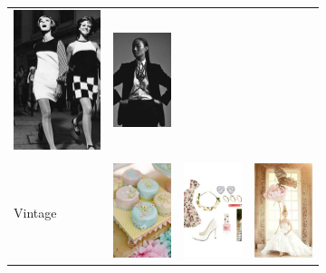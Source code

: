\begin{figure}
\begin{subfigure}[t]{0.48\linewidth}
\begin{tabular}{m{.05in}|m{\dgap} m{\dgap} m{\dgap}}
    \includegraphics[width=.8in]{../style/figures/flickr_on_pinterest/dress/pred_style_Noir/h/1.jpg} &
    \includegraphics[width=.8in]{../style/figures/flickr_on_pinterest/dress/pred_style_Noir/h/2.jpg} \\ \\
    \begin{turn}{90}\small{Vintage}\end{turn} &
    \includegraphics[width=.8in]{../style/figures/flickr_on_pinterest/flower/pred_style_Vintage/h/0.jpg} &
    \includegraphics[width=.8in]{../style/figures/flickr_on_pinterest/flower/pred_style_Vintage/h/2.jpg} &
    \includegraphics[width=.8in]{../style/figures/flickr_on_pinterest/flower/pred_style_Vintage/h/3.jpg} \\
    \end{tabular}

\end{subfigure}
\end{figure}
